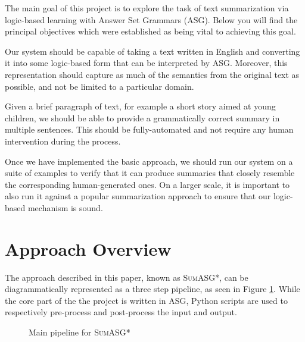 The main goal of this project is to explore the task of text summarization via logic-based learning with Answer Set Grammars (ASG). Below you will find the principal objectives which were established as being vital to achieving this goal.

\begin{objective}
Our system should be capable of taking a text written in English and converting it into some logic-based form that can be interpreted by ASG. Moreover, this representation should capture as much of the semantics from the original text as possible, and not be limited to a particular domain.
\end{objective}

\begin{objective}
Given a brief paragraph of text, for example a short story aimed at young children, we should be able to provide a grammatically correct summary in multiple sentences. This should be fully-automated and not require any human intervention during the process.
\end{objective}

\begin{objective}
Once we have implemented the basic approach, we should run our system on a suite of examples to verify that it can produce summaries that closely resemble the corresponding human-generated ones. On a larger scale, it is important to also run it against a popular summarization approach to ensure that our logic-based mechanism is sound.
\end{objective}

\section{Approach Overview}
\label{sec:approach_overview}

The approach described in this paper, known as \textsc{SumASG*}, can be diagrammatically represented as a three step pipeline, as seen in Figure \ref{fig:main_pipeline}. While the core part of the the project is written in ASG, Python scripts are used to respectively pre-process and post-process the input and output.

{
\begin{figure}[H]
\centering
{}
\caption{Main pipeline for \textsc{SumASG*}}
\label{fig:main_pipeline}
\end{figure}
}

